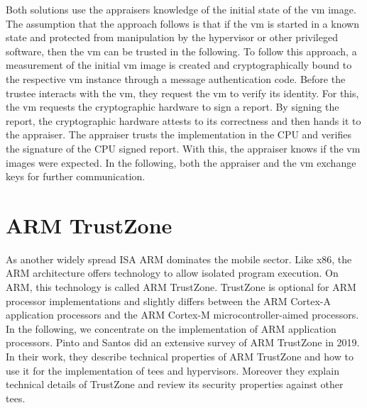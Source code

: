 Both solutions use the appraisers knowledge of the initial state of the \gls{vm}
image. The assumption that the approach follows is that if the \gls{vm} is
started in a known state and protected from manipulation by the hypervisor or
other privileged software, then the \gls{vm} can be trusted in the following. To
follow this approach, a measurement of the initial \gls{vm} image is created and
cryptographically bound to the respective \gls{vm} instance through a message
authentication code. Before the trustee interacts with the \gls{vm}, they
request the \gls{vm} to verify its identity. For this, the \gls{vm} requests the
cryptographic hardware to sign a report. By signing the report, the
cryptographic hardware attests to its correctness and then hands it to the
appraiser. The appraiser trusts the implementation in the CPU and verifies the
signature of the CPU signed report. With this, the appraiser knows if the \gls{vm}
images were expected. In the following, both the appraiser and the \gls{vm}
exchange keys for further communication.\\

\section{ARM TrustZone}
\label{sec:20:trustzone}
As another widely spread ISA ARM dominates the mobile sector. Like x86, the ARM
architecture offers technology to allow isolated program execution. On ARM, this
technology is called ARM TrustZone. TrustZone is optional for ARM processor
implementations and slightly differs between the ARM Cortex-A application
processors and the ARM Cortex-M microcontroller-aimed processors. In the
following, we concentrate on the implementation of ARM application
processors. Pinto and Santos did an extensive survey of ARM TrustZone in 2019.
In their work, they describe technical properties of ARM TrustZone and how to
use it for the implementation of \glspl{tee} and hypervisors. Moreover they
explain technical details of TrustZone and review its security properties
against other \glspl{tee}.\cite{pinto_demystifying_2019}\\

